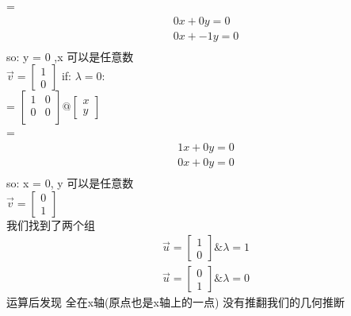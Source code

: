 \documentclass[12pt]{article}
\begin{document}
\begin{flushleft}
    = \begin{align}
        0x + 0y = 0  \\
        0x + -1y = 0 \\
    \end{align}
    so: y = 0 ,x 可以是任意数 \\
    $\vec{v} = \begin{bmatrix}
            1 \\
            0
        \end{bmatrix}$
    if: $\lambda = 0$: \\
    = $\begin{bmatrix}
            1 & 0 \\
            0 & 0 \\
        \end{bmatrix} @ \begin{bmatrix}
            x \\
            y
        \end{bmatrix}$ \\
    = \begin{align}
        1x + 0y = 0 \\
        0x + 0y = 0 \\
    \end{align}
    so: x = 0, y 可以是任意数 \\
    $\vec{v} = \begin{bmatrix}
            0 \\
            1
        \end{bmatrix}$ \\
    我们找到了两个组
    \begin{align}
        \vec{u} = \begin{bmatrix}
                      1 \\
                      0
                  \end{bmatrix} \& \lambda = 1 \\
        \vec{u} = \begin{bmatrix}
                      0 \\
                      1
                  \end{bmatrix} \& \lambda = 0
    \end{align}
    运算后发现 全在x轴(原点也是x轴上的一点) 没有推翻我们的几何推断
\end{flushleft}
\end{document}
